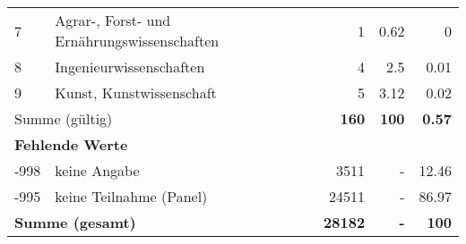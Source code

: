 \begin{longtable}{lXrrr}
     7 &
     \multicolumn{1}{X}{ Agrar-, Forst- und Ernährungswissenschaften   } &


       \num{1} &
       \num[round-mode=places,round-precision=2]{0,62} &
         \num[round-mode=places,round-precision=2]{0} \\

     8 &
     \multicolumn{1}{X}{ Ingenieurwissenschaften   } &


       \num{4} &
       \num[round-mode=places,round-precision=2]{2,5} &
         \num[round-mode=places,round-precision=2]{0,01} \\

     9 &
     \multicolumn{1}{X}{ Kunst, Kunstwissenschaft   } &


       \num{5} &
       \num[round-mode=places,round-precision=2]{3,12} &
         \num[round-mode=places,round-precision=2]{0,02} \\
     \midrule
     \multicolumn{2}{l}{Summe (gültig)} &
       \textbf{\num{160}} &
     \textbf{100} &
       \textbf{\num[round-mode=places,round-precision=2]{0,57}} \\
     \multicolumn{5}{l}{\textbf{Fehlende Werte}}\\
       -998 &
       keine Angabe &
         \num{3511} &
        - &
         \num[round-mode=places,round-precision=2]{12,46} \\
       -995 &
       keine Teilnahme (Panel) &
         \num{24511} &
        - &
         \num[round-mode=places,round-precision=2]{86,97} \\
     \midrule
     \multicolumn{2}{l}{\textbf{Summe (gesamt)}} &
          \textbf{\num{28182}} &
        \textbf{-} &
        \textbf{100} \\
     \bottomrule
     \end{longtable}
     
